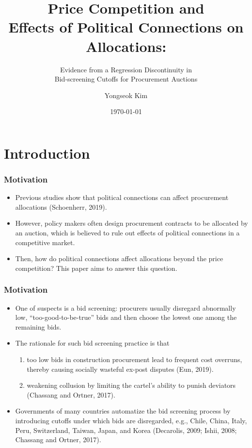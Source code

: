 \documentclass{beamer}
\title{Price Competition and \\Effects of Political Connections on Allocations:}
\subtitle{Evidence from a Regression Discontinuity in \\Bid-screening Cutoffs for Procurement Auctions}
\author{Yongseok Kim}
\date{\today}
\begin{document}
\frame{\titlepage}

\section{Introduction}

\begin{frame}
\frametitle{Motivation}
\begin{itemize}

\item Previous studies show that political connections can affect procurement allocations (Schoenherr, 2019).
\item However, policy makers often design procurement contracts to be allocated by an auction, which is believed to rule out effects of political connections in a competitive market.
\item Then, how do political connections affect allocations beyond the price competition? This paper aims to answer this question.

\end{itemize}
\end{frame}

\begin{frame}
\frametitle{Motivation}
\begin{itemize}

\item One of suspects is a bid screening: procurers usually disregard abnormally low, ``too-good-to-be-true'' bids and then choose the lowest one among the remaining bids.
\item The rationale for such bid screening practice is that
	\begin{enumerate}
	\item too low bids in construction procurement lead to frequent cost overruns, thereby causing socially wasteful ex-post disputes (Eun, 2019).
	\item weakening collusion by limiting the cartel's ability to punish deviators (Chassang and Ortner, 2017).
	\end{enumerate}
\item Governments of many countries automatize the bid screening process by introducing cutoffs under which bids are disregarded, e.g., Chile, China, Italy, Peru, Switzerland, Taiwan, Japan, and Korea (Decarolis, 2009; Ishii, 2008; Chassang and Ortner, 2017).

\end{itemize}
\end{frame}
\end{document}
